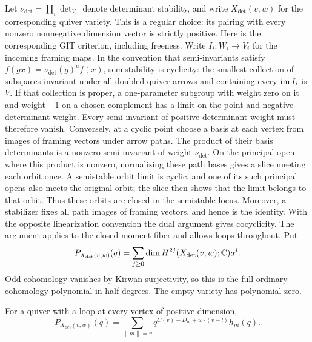 Let $\nu_{\det}=\prod_i\det_{V_i}$ denote determinant stability, and write
$X_{\det}(v,w)$ for the corresponding quiver variety.  This is a regular
choice: its pairing with every nonzero nonnegative dimension vector is
strictly positive.  Here is the corresponding GIT criterion, including
freeness.  Write $I_i:W_i\to V_i$ for the incoming framing maps.  In the
convention that semi-invariants satisfy $f(gx)=\nu_{\det}(g)^a f(x)$,
semistability is cyclicity: the smallest collection of subspaces invariant
under all doubled-quiver arrows and containing every $\operatorname{im} I_i$ is $V$.
If that collection is proper, a one-parameter subgroup with weight zero
on it and weight $-1$ on a chosen complement has a limit on the point and
negative determinant weight.  Every semi-invariant of positive determinant
weight must therefore vanish.  Conversely, at a cyclic point choose a
basis at each vertex from images of framing vectors under arrow paths.
The product of their basis determinants is a nonzero semi-invariant of
weight $\nu_{\det}$.  On the principal open where this product is nonzero,
normalizing these path bases gives a slice meeting each orbit once.  A
semistable orbit limit is cyclic, and one of its such principal opens also
meets the original orbit; the slice then shows that the limit belongs to
that orbit.  Thus these orbits are closed in the semistable locus.
Moreover, a stabilizer fixes all path images of framing vectors, and hence
is the identity.  With the opposite linearization convention the dual
argument gives cocyclicity.  The argument applies to the closed moment
fiber and allows loops throughout.  Put
\[
 P_{X_{\det}(v,w)}(q)
 =\sum_{j\geq0}\dim H^{2j}(X_{\det}(v,w);\mathbb C)q^j.
\]
Odd cohomology vanishes by Kirwan surjectivity, so this is the full ordinary
cohomology polynomial in half degrees.  The empty variety has polynomial
zero.

\begin{proposition}\label{prop:hausel-identification}
For a quiver with a loop at every vertex of positive dimension,
\begin{equation}\label{eq:hausel-cut-bound}
 P_{X_{\det}(v,w)}(q)
 =\sum_{\|m\|=v}
   q^{C(v)-D_m+w\cdot(v-l)}h_m(q).
\end{equation}
\end{proposition}

